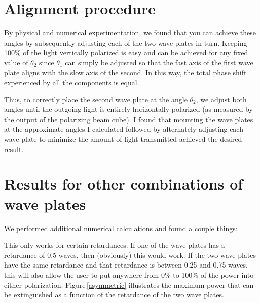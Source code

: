 \section{Alignment procedure}
By physical and numerical experimentation, we found that you can achieve these angles by subsequently adjusting each of the two wave plates in turn. Keeping 100\% of the light vertically polarized is easy and can be achieved for any fixed value of $\theta_2$ since $\theta_1$ can simply be adjusted so that the fast axis of the first wave plate aligns with the slow axis of the second. In this way, the total phase shift experienced by all the components is equal.

Thus, to correctly place the second wave plate at the angle  $\theta_2$, we adjust both angles until the outgoing light is entirely horizontally polarized (as measured by the output of the polarizing beam cube). I found that mounting the wave plates at the approximate angles I calculated followed by alternately adjusting each wave plate to minimize the amount of light transmitted achieved the desired result. 

\section{Results for other combinations of wave plates}
We performed additional numerical calculations and found a couple things:

This only works for certain retardances. If one of the wave plates has a retardance of 0.5 waves, then (obviously) this would work. If the two wave plates have the same retardance and that retardance is between 0.25 and 0.75 waves, this will also allow the user to put anywhere from 0\% to 100\% of the power into either polarization. Figure\,\ref{asymmetric} illustrates the maximum power that can be extinguished as a function of the retardance of the two wave plates.


